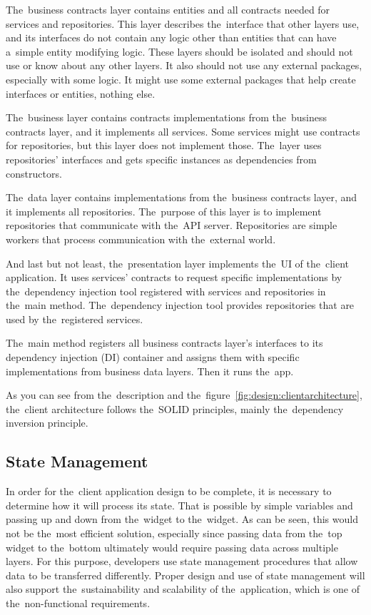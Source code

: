 The~business contracts layer contains entities and all contracts needed for services and repositories.
This layer describes the~interface that other layers use, and its interfaces do not contain any logic other than entities that can have a~simple entity modifying logic.
These layers should be isolated and should not use or know about any other layers.
It also should not use any external packages, especially with some logic.
It might use some external packages that help create interfaces or entities, nothing else.

The~business layer contains contracts implementations from the~business contracts layer, and it implements all services.
Some services might use contracts for repositories, but this layer does not implement those.
The~layer uses repositories' interfaces and gets specific instances as dependencies from constructors.

The~data layer contains implementations from the~business contracts layer, and it implements all repositories.
The~purpose of this layer is to implement repositories that communicate with the~API server.
Repositories are simple workers that process communication with the~external world.

And last but not least, the~presentation layer implements the~UI of the~client application.
It uses services' contracts to request specific implementations by the~dependency injection tool registered with services and repositories in the~main method.
The~dependency injection tool provides repositories that are used by the~registered services.

The~main method registers all business contracts layer's interfaces to its dependency injection (DI) container and assigns them with specific implementations from business data layers.
Then it runs the~app.

As you can see from the~description and the~figure~\ref{fig:design:clientarchitecture}, the~client architecture follows the~SOLID principles, mainly the~dependency inversion principle. 

\subsection{State Management}

In order for the~client application design to be complete, it is necessary to determine how it will process its state.
That is possible by simple variables and passing up and down from the~widget to the~widget.
As can be seen, this would not be the~most efficient solution, especially since passing data from the~top widget to the~bottom ultimately would require passing data across multiple layers.
For this purpose, developers use state management procedures that allow data to be transferred differently.
Proper design and use of state management will also support the~sustainability and scalability of the~application, which is one of the~non-functional requirements.

